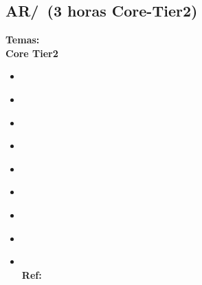 \subsection{AR/\ARMemorysystemorganizationandarchitecture~(3 horas Core-Tier2)}\label{sec:BOK:ARMemorysystemorganizationandarchitecture}
\noindent \textbf{Temas:}\\
\noindent \textbf{Core Tier2}
\begin{itemize}
	\item \ARMemorysystemorganizationandarchitectureTopicStorage\label{sec:BOK:ARMemorysystemorganizationandarchitectureTopicStorage}
	\item \ARMemorysystemorganizationandarchitectureTopicMemory\label{sec:BOK:ARMemorysystemorganizationandarchitectureTopicMemory}
	\item \ARMemorysystemorganizationandarchitectureTopicMain\label{sec:BOK:ARMemorysystemorganizationandarchitectureTopicMain}
	\item \ARMemorysystemorganizationandarchitectureTopicLatency\label{sec:BOK:ARMemorysystemorganizationandarchitectureTopicLatency}
	\item \ARMemorysystemorganizationandarchitectureTopicCache\label{sec:BOK:ARMemorysystemorganizationandarchitectureTopicCache}
	\item \ARMemorysystemorganizationandarchitectureTopicMultiprocessor\label{sec:BOK:ARMemorysystemorganizationandarchitectureTopicMultiprocessor}
	\item \ARMemorysystemorganizationandarchitectureTopicVirtual\label{sec:BOK:ARMemorysystemorganizationandarchitectureTopicVirtual}
	\item \ARMemorysystemorganizationandarchitectureTopicFault\label{sec:BOK:ARMemorysystemorganizationandarchitectureTopicFault}
	\item \ARMemorysystemorganizationandarchitectureTopicError\xspace \\ \textbf{Ref:} \label{sec:BOK:ARMemorysystemorganizationandarchitectureTopicError}
\end{itemize}


